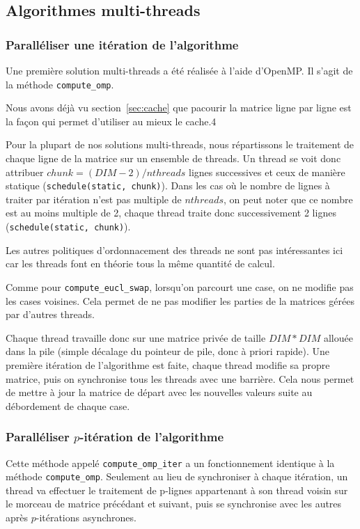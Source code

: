 \subsection{Algorithmes multi-threads}

\subsubsection{Paralléliser une itération de l'algorithme}

Une première solution multi-threads a été réalisée à l'aide
d'OpenMP. Il s'agit de la méthode \texttt{compute\_omp}.
\medskip

Nous avons déjà vu section~\ref{sec:cache} que pacourir la matrice
ligne par ligne est la façon qui permet d'utiliser au mieux le cache.4

Pour la plupart de nos solutions multi-threads, nous répartissons le
traitement de chaque ligne de la matrice sur un ensemble de
threads. Un thread se voit donc attribuer $chunk=(DIM-2)/nthreads$
lignes successives et ceux de manière statique
(\texttt{schedule(static, chunk)}). Dans les cas où le nombre de
lignes à traiter par itération n'est pas multiple de $nthreads$, on
peut noter que ce nombre est au moins multiple de 2, chaque thread
traite donc successivement 2 lignes (\texttt{schedule(static,
  chunk)}).

Les autres politiques d'ordonnacement des threads ne sont pas
intéressantes ici car les threads font en théorie tous la même
quantité de calcul.

Comme pour \texttt{compute\_eucl\_swap}, lorsqu'on parcourt une case,
on ne modifie pas les cases voisines. Cela permet de ne pas modifier
les parties de la matrices gérées par d'autres threads.
\medskip

Chaque thread travaille donc sur une matrice privée de taille
$DIM*DIM$ allouée dans la pile (simple décalage du pointeur de pile,
donc à priori rapide). Une première itération de l'algorithme est
faite, chaque thread modifie sa propre matrice, puis on synchronise
tous les threads avec une barrière. Cela nous permet de mettre à jour
la matrice de départ avec les nouvelles valeurs suite au débordement
de chaque case.
\medskip

\subsubsection{Paralléliser $p$-itération de l'algorithme}

Cette méthode appelé \texttt{compute\_omp\_iter} a un fonctionnement
identique à la méthode \texttt{compute\_omp}. Seulement au lieu de
synchroniser à chaque itération, un thread va effectuer le traitement
de p-lignes appartenant à son thread voisin sur le morceau de matrice
précédant et suivant, puis se synchronise avec les autres après
$p$-itérations asynchrones.
\medskip

